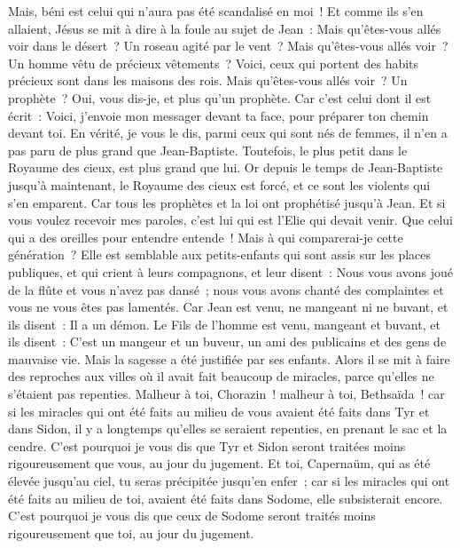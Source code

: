 \begin{multicols}{2}
Mais, béni est celui qui n'aura pas été scandalisé en moi~!
Et comme ils s'en allaient, Jésus se mit à dire à la foule au sujet de Jean~: Mais qu'êtes-vous allés voir dans le désert~? Un roseau agité par le vent~?
Mais qu'êtes-vous allés voir~? Un homme vêtu de précieux vêtements~? Voici, ceux qui portent des habits précieux sont dans les maisons des rois.
Mais qu'êtes-vous allés voir~? Un prophète~? Oui, vous dis-je, et plus qu'un prophète.
Car c'est celui dont il est écrit~: Voici, j'envoie mon messager devant ta face, pour préparer ton chemin devant toi.
En vérité, je vous le dis, parmi ceux qui sont nés de femmes, il n'en a pas paru de plus grand que Jean-Baptiste. Toutefois, le plus petit dans le Royaume des cieux, est plus grand que lui.
Or depuis le temps de Jean-Baptiste jusqu'à maintenant, le Royaume des cieux est forcé, et ce sont les violents qui s'en emparent.
Car tous les prophètes et la loi ont prophétisé jusqu'à Jean.
Et si vous voulez recevoir mes paroles, c'est lui qui est l'Elie qui devait venir.
Que celui qui a des oreilles pour entendre entende~!
Mais à qui comparerai-je cette génération~? Elle est semblable aux petits-enfants qui sont assis sur les places publiques, et qui crient à leurs compagnons,
et leur disent~: Nous vous avons joué de la flûte et vous n'avez pas dansé~; nous vous avons chanté des complaintes et vous ne vous êtes pas lamentés.
Car Jean est venu, ne mangeant ni ne buvant, et ils disent~: Il a un démon.
Le Fils de l'homme est venu, mangeant et buvant, et ils disent~: C'est un mangeur et un buveur, un ami des publicains et des gens de mauvaise vie. Mais la sagesse a été justifiée par ses enfants.
Alors il se mit à faire des reproches aux villes où il avait fait beaucoup de miracles, parce qu'elles ne s'étaient pas repenties.
Malheur à toi, Chorazin~! malheur à toi, Bethsaïda~! car si les miracles qui ont été faits au milieu de vous avaient été faits dans Tyr et dans Sidon, il y a longtemps qu'elles se seraient repenties, en prenant le sac et la cendre.
C'est pourquoi je vous dis que Tyr et Sidon seront traitées moins rigoureusement que vous, au jour du jugement.
Et toi, Capernaüm, qui as été élevée jusqu'au ciel, tu seras précipitée jusqu'en enfer~; car si les miracles qui ont été faits au milieu de toi, avaient été faits dans Sodome, elle subsisterait encore.
C'est pourquoi je vous dis que ceux de Sodome seront traités moins rigoureusement que toi, au jour du jugement.

\end{multicols}
